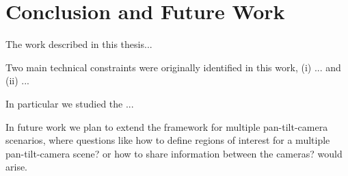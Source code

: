 \chapter{ Conclusion and Future Work}

The work described in this thesis...

Two main technical constraints were originally identified in this work, (i) ... and (ii) ...

In particular we studied the ...

In future work we plan to extend the framework for multiple pan-tilt-camera scenarios, where questions like how to define regions of interest for a multiple pan-tilt-camera scene? or how to share information between the cameras? would arise.
